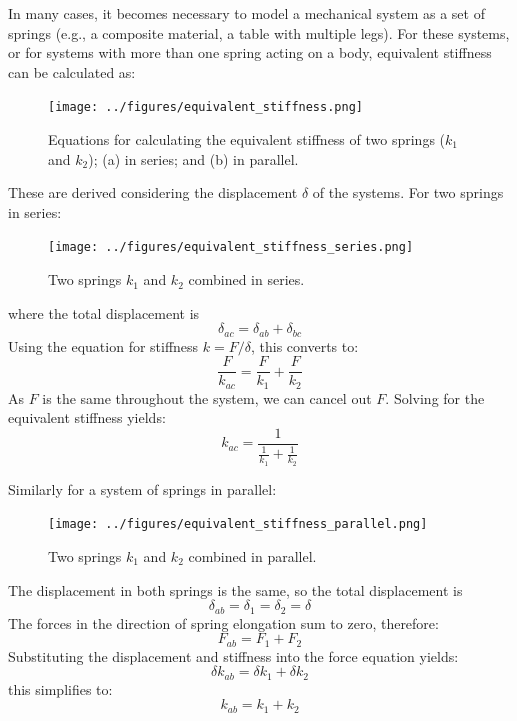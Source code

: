 \documentclass[12pt,letter]{article}
\begin{document}
			In many cases, it becomes necessary to model a mechanical system as a set of springs (e.g., a composite material, a table with multiple legs).  For these systems, or for systems with more than one spring acting on a body, equivalent stiffness can be calculated as:
			\begin{figure}[H]
				\centering
				\texttt{[image: ../figures/equivalent\_stiffness.png]}
				\caption{Equations for calculating the equivalent stiffness of two springs ($k_1$ and $k_2$); (a) in series; and (b) in parallel.}
			\end{figure}	
			These are derived considering the displacement $\delta$ of the systems. For two springs in series:
			\begin{figure}[H]
				\centering
				\texttt{[image: ../figures/equivalent\_stiffness\_series.png]}
				\caption{Two springs $k_1$ and $k_2$ combined in series.}
			\end{figure}			
			\noindent where the total displacement is 
			\begin{equation}
				\delta_{ac} = \delta_{ab} + \delta_{bc}
			\end{equation}
			Using the equation for stiffness $k=F/\delta$, this converts to:
			\begin{equation}
				\frac{F}{k_{ac}} = \frac{F}{k_{1}} + \frac{F}{k_{2}}
			\end{equation}
			As $F$ is the same throughout the system, we can cancel out $F$. Solving for the equivalent stiffness yields:
			\begin{equation}
				k_{ac} = \frac{1}{\frac{1}{k_1}+\frac{1}{k_2}}
			\end{equation}
		
			Similarly for a system of springs in parallel:
			\begin{figure}[H]
				\centering
				\texttt{[image: ../figures/equivalent\_stiffness\_parallel.png]}
				\caption{Two springs $k_1$ and $k_2$ combined in parallel.}				
			\end{figure}			
			\noindent The displacement in both springs is the same, so the total displacement is 
			\begin{equation}
				\delta_{ab} = \delta_{\text{1}} =  \delta_{\text{2}} = \delta
			\end{equation}
			The forces in the direction of spring elongation sum to zero, therefore:
			\begin{equation}
				F_{ab} = F_{\text{1}} +  F_{\text{2}}
			\end{equation}			
			Substituting the displacement and stiffness into the force equation yields:
			\begin{equation}
				\delta k_{ab} = 	\delta k_{1} +  \delta k_{2}
			\end{equation}				
			this simplifies to:
			\begin{equation}
				k_{ab} = k_1+k_2
			\end{equation}
			
\end{document}
